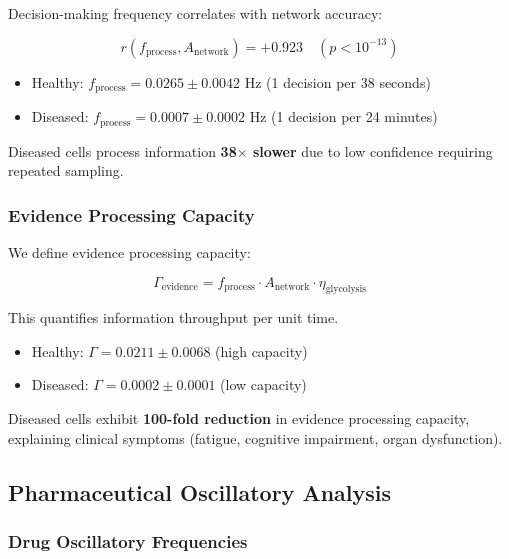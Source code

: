 \documentclass{article}
\begin{document}
Decision-making frequency correlates with network accuracy:

\begin{equation}
r(f_{\text{process}}, A_{\text{network}}) = +0.923 \quad (p < 10^{-13})
\end{equation}

\begin{itemize}
    \item Healthy: $f_{\text{process}} = 0.0265 \pm 0.0042$ Hz (1 decision per 38 seconds)
    \item Diseased: $f_{\text{process}} = 0.0007 \pm 0.0002$ Hz (1 decision per 24 minutes)
\end{itemize}

Diseased cells process information \textbf{38$\times$ slower} due to low confidence requiring repeated sampling.

\subsubsection{Evidence Processing Capacity}

We define evidence processing capacity:

\begin{equation}
\Gamma_{\text{evidence}} = f_{\text{process}} \cdot A_{\text{network}} \cdot \eta_{\text{glycolysis}}
\end{equation}

This quantifies information throughput per unit time.

\begin{itemize}
    \item Healthy: $\Gamma = 0.0211 \pm 0.0068$ (high capacity)
    \item Diseased: $\Gamma = 0.0002 \pm 0.0001$ (low capacity)
\end{itemize}

Diseased cells exhibit \textbf{100-fold reduction} in evidence processing capacity, explaining clinical symptoms (fatigue, cognitive impairment, organ dysfunction).

\subsection{Pharmaceutical Oscillatory Analysis}

\subsubsection{Drug Oscillatory Frequencies}
\end{document}

